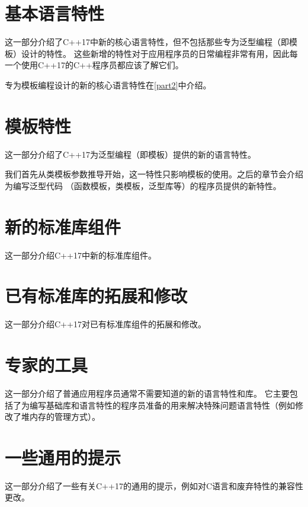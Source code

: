 \documentclass[twoside,10pt,AutoFakeBold,AutoFakeSlant]{book}
\begin{document}
    \frontmatter
    \pagestyle{front}
    \tableofcontents

    \mainmatter
    \pagestyle{main}

    \part{基本语言特性}\label{part1}
    这一部分介绍了C++17中新的核心语言特性，但不包括那些专为泛型编程（即模板）设计的特性。
    这些新增的特性对于应用程序员的日常编程非常有用，因此每一个使用C++17的C++程序员都应该了解它们。

    专为模板编程设计的新的核心语言特性在\autoref{part2}中介绍。

    
    
    
    
    
    
    
    


    \part{模板特性}\label{part2}
    这一部分介绍了C++17为泛型编程（即模板）提供的新的语言特性。

    我们首先从类模板参数推导开始，这一特性只影响模板的使用。之后的章节会介绍为编写泛型代码
    （函数模板，类模板，泛型库等）的程序员提供的新特性。

    
    
    
    
    
    


    \part{新的标准库组件}\label{part3}
    这一部分介绍C++17中新的标准库组件。

    
    
    
    
    
    


    \part{已有标准库的拓展和修改}\label{part4}
    这一部分介绍C++17对已有标准库组件的拓展和修改。

    
    
    
    
    
    
    
    


    \part{专家的工具}\label{part5}
    这一部分介绍了普通应用程序员通常不需要知道的新的语言特性和库。
    它主要包括了为编写基础库和语言特性的程序员准备的用来解决特殊问题语言特性（例如修改了堆内存的管理方式）。

    
    
    
    
    


    \part{一些通用的提示}\label{part6}
    这一部分介绍了一些有关C++17的通用的提示，例如对C语言和废弃特性的兼容性更改。
    
    

    \backmatter
\end{document}
